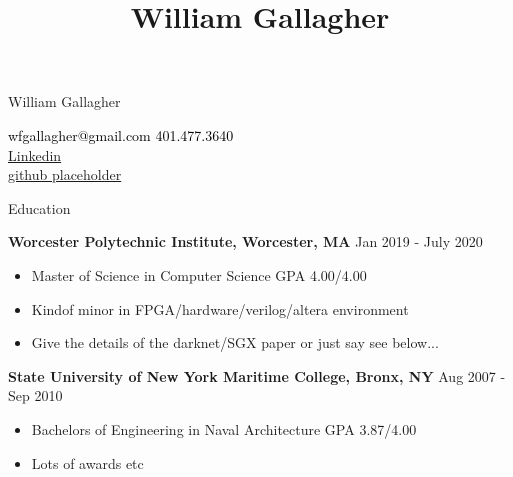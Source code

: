 \documentclass[10pt,a4paper]{article}
\title{William Gallagher}
\begin{document}
{\selectfont

\begin{tcolorbox}
  \begin{minipage}{.5\textwidth}
    \huge{William Gallagher}
  \end{minipage}
  \begin{minipage}{.5\textwidth}
      \begin{center}
        \begin{flushright}
          {\textcolor{black}
            {
              {\selectfont
                wfgallagher@gmail.com  401.477.3640\\
                \href{https://www.linkedin.com/in/william-gallagher-705199170}{Linkedin} \\
                \href{https://www.github.com}{github placeholder} \\
              }
            }
          }
        \end{flushright}
      \end{center}
  \end{minipage}
\end{tcolorbox}

\begin{tcolorbox}

  {\selectfont
    \begin{center}
      \LARGE{Education}
    \end{center}
  }

  \tcblower

      \large{\textbf{Worcester Polytechnic Institute, Worcester, MA }}
      \hfill
      \large{Jan 2019 - July 2020}
      \begin{itemize}[noitemsep]
        \item Master of Science in Computer Science GPA 4.00/4.00
        \item Kindof minor in FPGA/hardware/verilog/altera environment
        \item Give the details of the darknet/SGX paper or just say see below...

      \end{itemize}

      \large{\textbf{State University of New York Maritime College, Bronx, NY}}
      \hfill
      \large{Aug 2007 - Sep 2010}
      \begin{itemize}[noitemsep]
        \item Bachelors of Engineering in Naval Architecture GPA 3.87/4.00
        \item Lots of awards etc
      \end{itemize}
\end{tcolorbox}

}
\end{document}
